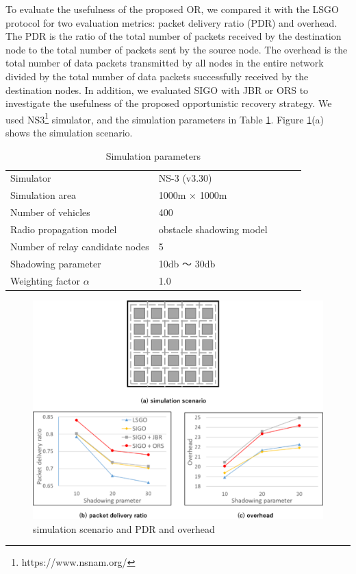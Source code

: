 \documentclass{comex}
\begin{document}
To evaluate the usefulness of the proposed OR, we compared it with the LSGO protocol for two evaluation metrics: packet delivery ratio (PDR) and overhead. 
The PDR is the ratio of the total number of packets received by the destination node to the total number of packets sent by the source node. The overhead is the total number of data packets transmitted by all nodes in the entire network divided by the total number of data packets successfully received by the destination nodes. 
In addition, we evaluated SIGO with JBR or ORS to investigate the usefulness of the proposed opportunistic recovery strategy. We used NS3\footnote{https://www.nsnam.org/} simulator, and the simulation parameters in Table \ref{tab:parameter}. Figure \ref{fig:evaluation}(a) shows the simulation scenario. 



\begin{table}[!ht]
\begin{center}
\caption{Simulation parameters}
\label{tab:parameter}
\begin{tabular}{|l|l|lll}
\cline{1-2}
Simulator    & NS-3 (v3.30)   &  &  &  \\ \cline{1-2}
Simulation area    & 1000m × 1000m   &  &  &  \\ \cline{1-2}
Number of vehicles & 400      &  &  &  \\ \cline{1-2}
Radio propagation model    & obstacle shadowing model\cite{obstacle}&  &  &  \\ \cline{1-2}
Number of relay candidate nodes  & 5       &  &  \\ \cline{1-2}
Shadowing parameter   & 10db ～ 30db      &  &  &  \\ \cline{1-2}
Weighting factor $\alpha$  & 1.0      &  &  &  \\ \cline{1-2}
\end{tabular}
\end{center}
\end{table}

\begin{figure}[!ht]
\centering
\includegraphics[width=120mm]{figures/evaluation.eps}
\caption{simulation scenario and PDR and overhead }
\label{fig:evaluation}
\end{figure}
\end{document}
